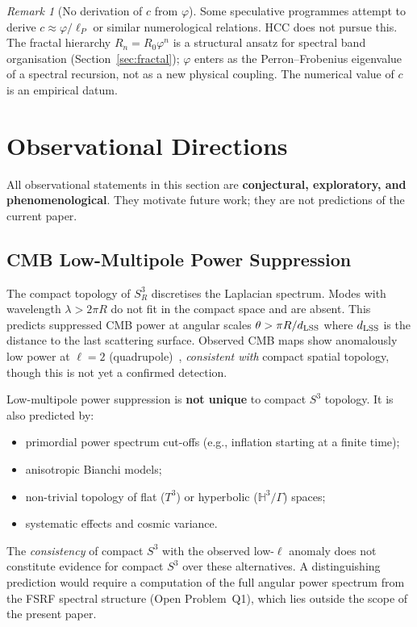 \documentclass[12pt,a4paper]{article}
\theoremstyle{plain}
\theoremstyle{definition}
\theoremstyle{remark}
\newtheorem{remark}[theorem]{Remark}
\newcommand{\vph}{\varphi}
\begin{document}
\begin{remark}[No derivation of $c$ from $\vph$]
\label{rem:no_derive}
Some speculative programmes attempt to derive $c \approx \vph/\ell_P$
or similar numerological relations.
HCC does not pursue this.
The fractal hierarchy $R_n = R_0\vph^n$ is a structural ansatz for
spectral band organisation (Section~\ref{sec:fractal}); $\vph$ enters
as the Perron--Frobenius eigenvalue of a spectral recursion, not as a
new physical coupling.
The numerical value of $c$ is an empirical datum.
\end{remark}

\section{Observational Directions}
\label{sec:observational}

\begin{tcolorbox}[limbox={Status of Observational Claims}]
All observational statements in this section are
\textbf{conjectural, exploratory, and phenomenological}.
They motivate future work; they are not predictions of the current paper.
\end{tcolorbox}

\subsection{CMB Low-Multipole Power Suppression}

The compact topology of $S^3_R$ discretises the Laplacian spectrum.
Modes with wavelength $\lambda > 2\pi R$ do not fit in the compact space and are
absent.
This predicts suppressed CMB power at angular scales $\theta > \pi R/d_{\rm LSS}$
where $d_{\rm LSS}$ is the distance to the last scattering surface.
Observed CMB maps show anomalously low power at $\ell = 2$ (quadrupole)~\cite{Planck18},
\emph{consistent with} compact spatial topology,
though this is not yet a confirmed detection.

\begin{tcolorbox}[limbox={Disclaimer: Non-Uniqueness of Low-$\ell$ Suppression}]
Low-multipole power suppression is \textbf{not unique} to compact $S^3$ topology.
It is also predicted by:
\begin{itemize}[leftmargin=1.4em]
  \item primordial power spectrum cut-offs (e.g., inflation starting at a finite time);
  \item anisotropic Bianchi models;
  \item non-trivial topology of flat ($T^3$) or hyperbolic ($\mathbb{H}^3/\Gamma$) spaces;
  \item systematic effects and cosmic variance.
\end{itemize}
The \emph{consistency} of compact $S^3$ with the observed low-$\ell$ anomaly does
not constitute evidence for compact $S^3$ over these alternatives.
A distinguishing prediction would require a computation of the full angular power
spectrum from the FSRF spectral structure (Open Problem~Q1), which lies outside
the scope of the present paper.
\end{tcolorbox}
\end{document}
